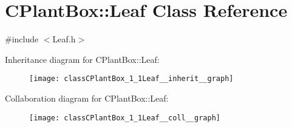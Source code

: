 \hypertarget{classCPlantBox_1_1Leaf}{}\section{C\+Plant\+Box\+:\+:Leaf Class Reference}
\label{classCPlantBox_1_1Leaf}


{\ttfamily \#include $<$Leaf.\+h$>$}



Inheritance diagram for C\+Plant\+Box\+:\+:Leaf\+:\nopagebreak
\begin{figure}[H]
\begin{center}
\leavevmode
\texttt{[image: classCPlantBox\_1\_1Leaf\_\_inherit\_\_graph]}
\end{center}
\end{figure}


Collaboration diagram for C\+Plant\+Box\+:\+:Leaf\+:\nopagebreak
\begin{figure}[H]
\begin{center}
\leavevmode
\texttt{[image: classCPlantBox\_1\_1Leaf\_\_coll\_\_graph]}
\end{center}
\end{figure}
